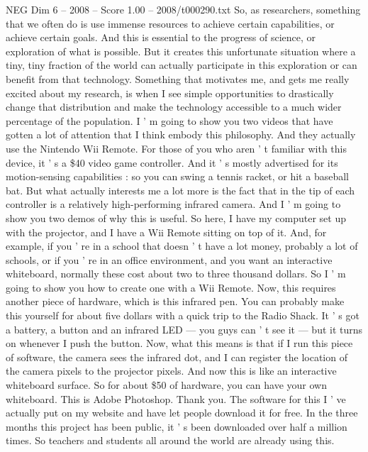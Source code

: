 \begin{textsample}{NEG Dim 6 – 2008 – Score 1.00 – 2008/t000290.txt}  \label{ex:f6_neg_068}
So, as researchers, something that we often do is use immense resources to achieve certain capabilities, or achieve certain goals.
And this is essential to the progress of science, or exploration of what is possible.
But it creates this unfortunate situation where a tiny, tiny fraction of the world can actually participate in this exploration or can benefit from that technology.
Something that motivates me, and gets me really excited about my research, is when I see simple opportunities to drastically change that distribution and make the technology accessible to a much wider percentage of the population.
I ' m going to show you two videos that have gotten a lot of attention that I think embody this philosophy.
And they actually use the Nintendo Wii Remote.
For those of you who aren ' t familiar with this device, it ' s a \$40 video game controller.
And it ' s mostly advertised for its motion-sensing capabilities : so you can swing a tennis racket, or hit a baseball bat.
But what actually interests me a lot more is the fact that in the tip of each controller is a relatively high-performing infrared camera.
And I ' m going to show you two demos of why this is useful.
So here, I have my computer set up with the projector, and I have a Wii Remote sitting on top of it.
And, for example, if you ' re in a school that doesn ' t have a lot money, probably a lot of schools, or if you ' re in an office environment, and you want an interactive whiteboard, normally these cost about two to three thousand dollars.
So I ' m going to show you how to create one with a Wii Remote.
Now, this requires another piece of hardware, which is this infrared pen.
You can probably make this yourself for about five dollars with a quick trip to the Radio Shack.
It ' s got a battery, a button and an infrared LED — you guys can ' t see it — but it turns on whenever I push the button.
Now, what this means is that if I run this piece of software, the camera sees the infrared dot, and I can register the location of the camera pixels to the projector pixels.
And now this is like an interactive whiteboard surface.
So for about \$50 of hardware, you can have your own whiteboard.
This is Adobe Photoshop.
Thank you.
The software for this I ' ve actually put on my website and have let people download it for free.
In the three months this project has been public, it ' s been downloaded over half a million times.
So teachers and students all around the world are already using this.

\end{textsample}

